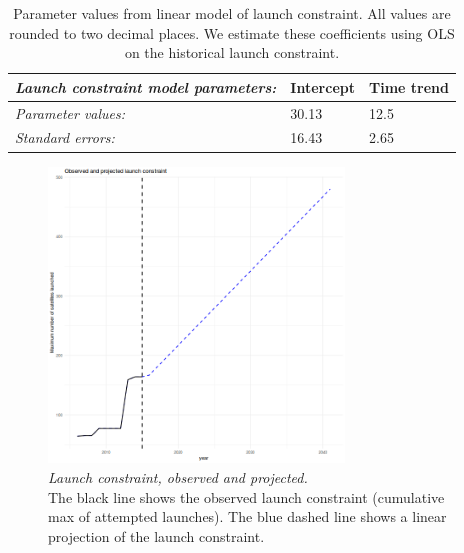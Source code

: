 \documentclass[12pt]{article}
\begin{document}
\begin{table}[H]
	\centering
	\begin{tabular}{|l|l|l|}
		\hline
		\textit{Launch constraint model parameters:} & Intercept & Time trend \\ \hline
		\textit{Parameter values:}                   & 30.13     & 12.5       \\ \hline
		\textit{Standard errors:}                    & 16.43     & 2.65       \\ \hline
	\end{tabular}
	\caption{Parameter values from linear model of launch constraint. All values are rounded to two decimal places. We estimate these coefficients using OLS on the historical launch constraint.}
	\label{lc_coefs}
\end{table}

\begin{figure}[H]
	\centering
	\includegraphics[width=0.7\textwidth]{../../images/linear_trend_launch_constraint.png}
	\captionsetup{format=hang}
	\caption{\textit{Launch constraint, observed and projected.} \\
		The black line shows the observed launch constraint (cumulative max of attempted launches). The blue dashed line shows a linear projection of the launch constraint.
	}
	\label{lc_time_path}
\end{figure}
\end{document}
